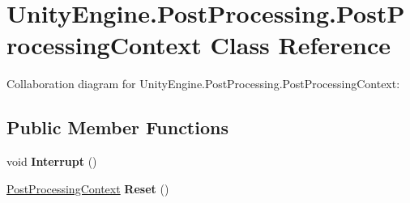 \hypertarget{class_unity_engine_1_1_post_processing_1_1_post_processing_context}{}\section{Unity\+Engine.\+Post\+Processing.\+Post\+Processing\+Context Class Reference}
\label{class_unity_engine_1_1_post_processing_1_1_post_processing_context}


Collaboration diagram for Unity\+Engine.\+Post\+Processing.\+Post\+Processing\+Context\+:
\subsection*{Public Member Functions}
\begin{DoxyCompactItemize}
\item 
\mbox{\label{class_unity_engine_1_1_post_processing_1_1_post_processing_context_a5576527ed48192d867c94726398fd83f}} 
void {\bfseries Interrupt} ()
\item 
\mbox{\label{class_unity_engine_1_1_post_processing_1_1_post_processing_context_ab29cec74ac7c25ed7793d1d4fcb82271}} 
\hyperlink{class_unity_engine_1_1_post_processing_1_1_post_processing_context}{Post\+Processing\+Context} {\bfseries Reset} ()
\end{DoxyCompactItemize}
